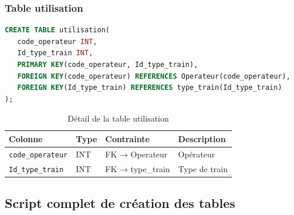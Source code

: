 \documentclass[12pt,a4paper]{article}
\begin{document}
\subsubsection{Table utilisation}
\begin{lstlisting}[language=SQL, caption=Structure de la table utilisation]
CREATE TABLE utilisation(
   code_operateur INT,
   Id_type_train INT,
   PRIMARY KEY(code_operateur, Id_type_train),
   FOREIGN KEY(code_operateur) REFERENCES Operateur(code_operateur),
   FOREIGN KEY(Id_type_train) REFERENCES type_train(Id_type_train)
);
\end{lstlisting}

\begin{table}[h!]
\centering
\begin{tabular}{|p{3.5cm}|p{2.5cm}|p{2.5cm}|p{4cm}|}
\hline
\textbf{Colonne} & \textbf{Type} & \textbf{Contrainte} & \textbf{Description} \\
\hline
\texttt{code\_operateur} & INT & FK → Operateur & Opérateur \\
\hline
\texttt{Id\_type\_train} & INT & FK → type\_train & Type de train \\
\hline
\end{tabular}
\caption{Détail de la table utilisation}
\end{table}

\subsection{Script complet de création des tables}
\end{document}
